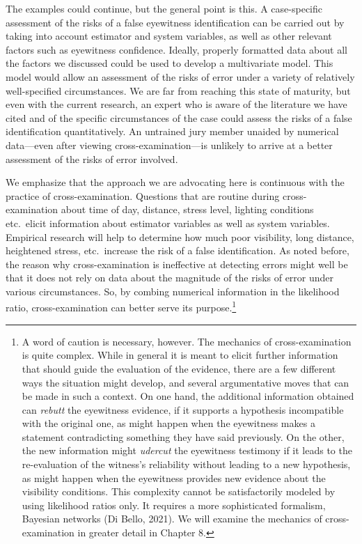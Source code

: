 \documentclass[
  letterpaper,
  DIV=11,
  numbers=noendperiod]{scrartcl}
\begin{document}
\vspace{1mm}
\footnotesize

\normalsize

The examples could continue, but the general point is this. A
case-specific assessment of the risks of a false eyewitness
identification can be carried out by taking into account estimator and
system variables, as well as other relevant factors such as eyewitness
confidence. Ideally, properly formatted data about all the factors we
discussed could be used to develop a multivariate model. This model
would allow an assessment of the risks of error under a variety of
relatively well-specified circumstances. We are far from reaching this
state of maturity, but even with the current research, an expert who is
aware of the literature we have cited and of the specific circumstances
of the case could assess the risks of a false identification
quantitatively. An untrained jury member unaided by numerical
data---even after viewing cross-examination---is unlikely to arrive at a
better assessment of the risks of error involved.

We emphasize that the approach we are advocating here is continuous with
the practice of cross-examination. Questions that are routine during
cross-examination about time of day, distance, stress level, lighting
conditions etc.~elicit information about estimator variables as well as
system variables. Empirical research will help to determine how much
poor visibility, long distance, heightened stress, etc.~increase the
risk of a false identification. As noted before, the reason why
cross-examination is ineffective at detecting errors might well be that
it does not rely on data about the magnitude of the risks of error under
various circumstances. So, by combing numerical information in the
likelihood ratio, cross-examination can better serve its
purpose.\footnote{A word of caution is necessary, however. The mechanics
  of cross-examination is quite complex. While in general it is meant to
  elicit further information that should guide the evaluation of the
  evidence, there are a few different ways the situation might develop,
  and several argumentative moves that can be made in such a context. On
  one hand, the additional information obtained can \textit{rebutt} the
  eyewitness evidence, if it supports a hypothesis incompatible with the
  original one, as might happen when the eyewitness makes a statement
  contradicting something they have said previously. On the other, the
  new information might \textit{udercut} the eyewitness testimony if it
  leads to the re-evaluation of the witness's reliability without
  leading to a new hypothesis, as might happen when the eyewitness
  provides new evidence about the visibility conditions. This complexity
  cannot be satisfactorily modeled by using likelihood ratios only. It
  requires a more sophisticated formalism, Bayesian networks (Di Bello,
  2021). We will examine the mechanics of cross-examination in greater
  detail in Chapter 8.}
\end{document}

